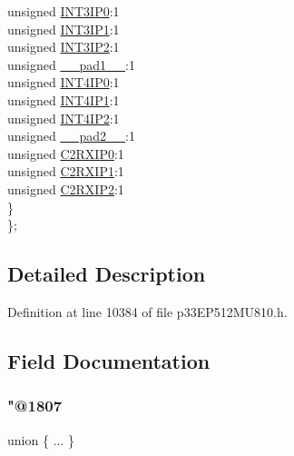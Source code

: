 \begin{DoxyCompactItemize}
\begin{tabbing}
\>\>unsigned \hyperlink{structtag_i_p_c13_b_i_t_s_a238f80c83adbbba3ae5630bd886c541c}{INT3IP0}:1\\
\>\>unsigned \hyperlink{structtag_i_p_c13_b_i_t_s_a37424fe79cc86384c090cb50393c9f28}{INT3IP1}:1\\
\>\>unsigned \hyperlink{structtag_i_p_c13_b_i_t_s_a81038132fd458a1d6bea5f6f328408c6}{INT3IP2}:1\\
\>\>unsigned \hyperlink{structtag_i_p_c13_b_i_t_s_acaf2d0924a107ec6e8d2e31febaf66f9}{\_\_pad1\_\_}:1\\
\>\>unsigned \hyperlink{structtag_i_p_c13_b_i_t_s_a8297e7c5d5b0e0da4974a59b72c8fe7a}{INT4IP0}:1\\
\>\>unsigned \hyperlink{structtag_i_p_c13_b_i_t_s_a4179db8d285b34d724033fed66f222bb}{INT4IP1}:1\\
\>\>unsigned \hyperlink{structtag_i_p_c13_b_i_t_s_a1dfd1967034610955af90329b8010616}{INT4IP2}:1\\
\>\>unsigned \hyperlink{structtag_i_p_c13_b_i_t_s_a4d97cc5f7d51d22fc2bf3eab35c9cb7f}{\_\_pad2\_\_}:1\\
\>\>unsigned \hyperlink{structtag_i_p_c13_b_i_t_s_a12177a3f3e7c6336f0ccad4ae6a389a7}{C2RXIP0}:1\\
\>\>unsigned \hyperlink{structtag_i_p_c13_b_i_t_s_a576ab91a14f05e408b3819d1fac0608d}{C2RXIP1}:1\\
\>\>unsigned \hyperlink{structtag_i_p_c13_b_i_t_s_adeb3672fc985855dde4099799859f8d2}{C2RXIP2}:1\\
\>\} \\
\}; \\

\end{tabbing}\end{DoxyCompactItemize}


\subsection{Detailed Description}


Definition at line 10384 of file p33\+E\+P512\+M\+U810.\+h.



\subsection{Field Documentation}
\mbox{\label{structtag_i_p_c13_b_i_t_s_a0c7fbb29655b148e5cc3000d8a758afb}} 
\subsubsection{\texorpdfstring{"@1807}{@1807}}
{\footnotesize\ttfamily union \{ ... \} }

